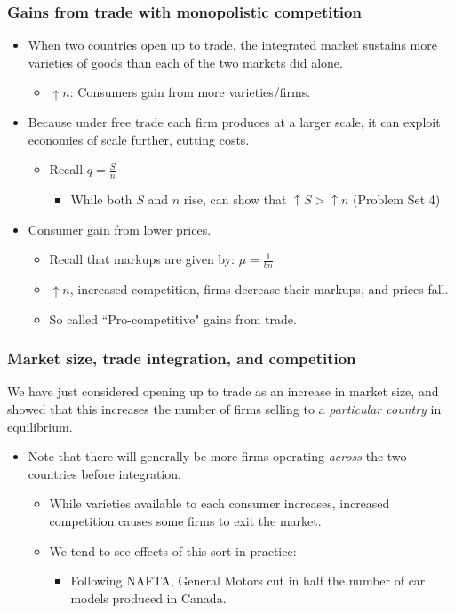 \documentclass{beamer}
\begin{document}
\begin{frame}
	\frametitle{Gains from trade with monopolistic competition}
\begin{itemize}
	\item When two countries open up to trade, the integrated market sustains more varieties of goods than each of the two markets did alone.
	\begin{itemize}
		\item $\uparrow n$: Consumers gain from more varieties/firms.
	\end{itemize}
	\item Because under free trade each firm produces at a larger scale, it can exploit economies of scale further, cutting costs.
		\begin{itemize}
			\item Recall $q=\frac{S}{n}$
							\begin{itemize}
								\item While both $S$ and $n$ rise, can show that $\uparrow S > \uparrow n$ (Problem Set 4)
							\end{itemize}
		\end{itemize}

	\item Consumer gain from lower prices.
			\begin{itemize}
			\item Recall that markups are given by: $\mu=\frac{1}{bn}$
			\item $\uparrow n$, increased competition, firms decrease their markups, and prices fall.
			\item So called ``Pro-competitive" gains from trade. 
			\end{itemize}
\end{itemize}

\end{frame}

\begin{frame}
	\frametitle{Market size, trade integration, and competition}
We have just considered opening up to trade as an increase in market size, and showed that this increases the number of firms selling to a \emph{particular country} in equilibrium.
	\begin{itemize}
		\item Note that there will generally be more firms operating \emph{across} the two countries before integration.
			\begin{itemize}
				\item While varieties available to each consumer increases, increased competition causes some firms to exit the market.
				\item We tend to see effects of this sort in practice:
					\begin{itemize}
						\item Following NAFTA, General Motors cut in half the number of car models produced in Canada. 
					\end{itemize}
			\end{itemize}
	\end{itemize}
\end{frame}
\end{document}
